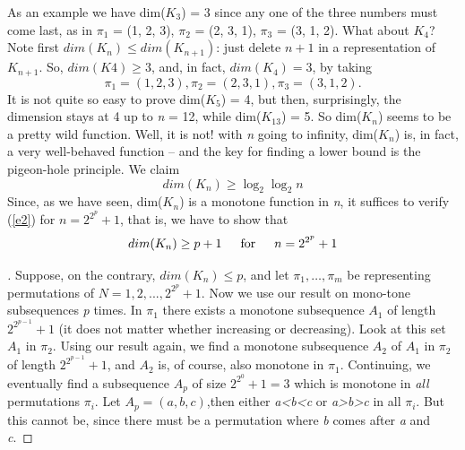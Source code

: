 \documentclass[10pt,twoside]{book}
\begin{document}
		As an example we have dim($K_3$) = 3 since any one of the three numbers
		must come last, as in $\pi_1$ = (1, 2, 3), $\pi_2$ = (2, 3, 1), $\pi_3$ = (3, 1, 2). What about $K_4$? Note first $dim(K_n) \leq dim(K_{n+1})$: just delete $n + 1$ in a representation of $K_{n+1}$. So, $dim(K4) \geq 3$, and, in fact, $dim(K_4) =3 $, by
		taking
		$$\pi_1 = (1, 2, 3), \pi_2 = (2, 3, 1), \pi_3 = (3, 1, 2).$$
		It is not quite so easy to prove dim($K_5$) = 4, but then, surprisingly, the
		dimension stays at 4 up to \textit{n} = 12, while dim($K_13$) = 5. So dim($K_n$) seems to be a pretty wild function. Well, it is not! with \textit{n} going to infinity, dim($K_n$) is, in fact, a very well-behaved function -- and the key for finding a lower bound is the pigeon-hole principle. We claim
		\begin{equation*}
			dim(K_n) \geq \log_{2}\log_{2}n \tag{2} \label{e2}
		\end{equation*}
		Since, as we have seen, dim($K_n$) is a monotone function in \textit{n}, it suffices to verify (\ref{e2}) for $n =2^{2^{p}} + 1$, that is, we have to show that
		$$dim(K_n) \geq p + 1\indent \text{for}\indent n =2^{2^{p}} + 1$$
		\begin{proof}[\unskip\nopunct]
			Suppose, on the contrary, $dim(K_n) \leq p$, and let $\pi_1,\dots,\pi_m$ be representing permutations of $N = {1, 2,...,2^{2^{p}} + 1}$. Now we use our result on mono-tone subsequences \textit{p} times. In $\pi_1$ there exists a monotone subsequence $A_1$ of length $2^{2^{p-1}} + 1$ (it does not matter whether increasing or decreasing). Look at this set $A_1$ in $\pi_2$. Using our result again, we ﬁnd a monotone subsequence $A_2$ of $A_1$ in $\pi_2$ of length $2^{2^{p-1}} + 1$, and $A_2$ is, of course, also monotone in $\pi_1$. Continuing, we eventually ﬁnd a subsequence $A_p$ of size $2^{2^{0}}+ 1 = 3$ which is monotone in \textit{all} permutations $\pi_i$. Let $A_p = (a,b,c)$,then either \textit{a\textless b\textless c} or \textit{a\textgreater b\textgreater c} in all $\pi_i$. But this cannot be, since there must be a permutation where \textit{b} comes after \textit{a} and \textit{c}.
		\end{proof}
\end{document}
